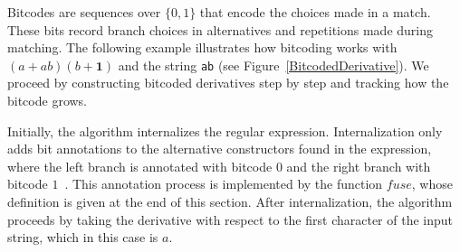 \documentclass[12pt]{article}
\newcommand{\ONE}{\textbf{1}}
\newcommand{\fuse}{\textit{fuse}}
\begin{document}
Bitcodes are sequences over $\{0,1\}$ that encode the choices made in a match. These bits record
branch choices in alternatives and repetitions made during matching. The following example
illustrates how bitcoding works with $(a+ab)(b+\ONE)$ and the string \texttt{ab} (see
Figure~\ref{BitcodedDerivative}). We proceed by constructing bitcoded derivatives step by step
and tracking how the bitcode grows.

Initially, the algorithm internalizes the regular expression.  
Internalization only adds bit annotations to the alternative constructors found in the expression, 
where the left branch is annotated with bitcode $0$ and the right branch with bitcode $1$~\cite{Sulzmann2014}.  
This annotation process is implemented by the function $\fuse$, whose definition is given at the end of this section.  
After internalization, the algorithm proceeds by taking the derivative with respect to the first character 
of the input string, which in this case is $a$.
\end{document}
